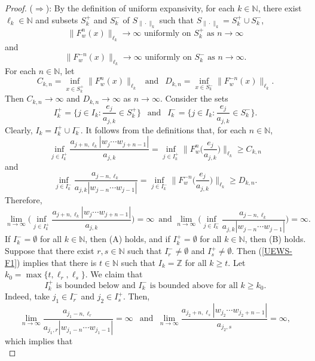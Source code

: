 \documentclass[10pt,a4paper]{amsart}
\newcommand{\N}{\mathbb{N}}   %
\newcommand{\Z}{\mathbb{Z}}   %
\begin{document}
\begin{proof}
($\Rightarrow$): By the definition of uniform expansivity, for each $k \in \N$, there exist $\ell_k \in \N$ 
and subsets $S_k^+$ and $S_k^-$ of $S_{\|\cdot\|_k}$ such that $S_{\|\cdot\|_k} = S_k^+ \cup S_k^-$,
\[
\|F_w^n(x)\|_{\ell_k} \to \infty \text{ uniformly on } S_k^+ \text{ as } n \to \infty
\]
and
\[
\|F_w^{-n}(x)\|_{\ell_k} \to \infty \text{ uniformly on } S_k^- \text{ as } n \to \infty.
\]
For each $n \in \N$, let
\[
C_{k,n} = \inf_{x \in S_k^+} \|F_w^n(x)\|_{\ell_k} \ \ \text{ and } \ \ D_{k,n} = \inf_{x \in S_k^-} \|F_w^{-n}(x)\|_{\ell_k}.
\]
Then $C_{k,n} \to \infty$ and $D_{k,n} \to \infty$ as $n \to \infty$. Consider the sets
\[
I_k^+ = \Big\{j \in I_k : \frac{e_j}{a_{j,k}} \in S_k^+\Big\} \ \ \text{ and } \ \ I_k^- = \Big\{j \in I_k : \frac{e_j}{a_{j,k}} \in S_k^-\Big\}.
\]
Clearly, $I_k = I_k^+ \cup I_k^-$. It follows from the definitions that, for each $n \in \N$,
\[
\inf_{j \in I_k^+} \frac{a_{j+n,\ell_k} |w_j \cdots w_{j+n-1}|}{a_{j,k}} 
  = \inf_{j \in I_k^+} \Big\|F_w^n\Big(\frac{e_j}{a_{j,k}}\Big)\Big\|_{\ell_k} \geq C_{k,n}
\]
and
\[
\inf_{j \in I_k^-} \frac{a_{j-n,\ell_k}}{a_{j,k} |w_{j-n} \cdots w_{j-1}|} 
  = \inf_{j \in I_k^-} \Big\|F_w^{-n}\Big(\frac{e_j}{a_{j,k}}\Big)\Big\|_{\ell_k} \geq D_{k,n}.
\]
Therefore, 
\begin{equation}\label{UEWS-F1}
\lim_{n \to \infty} \Big(\inf_{j \in I_k^+} \frac{a_{j+n,\ell_k} |w_j \cdots w_{j+n-1}|}{a_{j,k}}\Big) = \infty\, \text{ and }
\lim_{n \to \infty} \Big(\inf_{j \in I_k^-} \frac{a_{j-n,\ell_k}}{a_{j,k} |w_{j-n} \cdots w_{j-1}|}\Big) = \infty.
\end{equation}
If $I_k^- = \emptyset$ for all $k \in \N$, then (A) holds, and if $I_k^+ = \emptyset$ for all $k \in \N$, then (B) holds.
Suppose that there exist $r,s \in \N$ such that $I_r^- \neq \emptyset$ and $I_s^+ \neq \emptyset$.
Then (\ref{UEWS-F1}) implies that there is $t \in \N$ such that $I_k = \Z$ for all $k \geq t$.
Let $k_0 = \max\{t,\ell_r,\ell_s\}$. We claim that
\begin{equation}\label{UEWS-F2}
I_k^+ \text{ is bounded below and } I_k^- \text{ is bounded above for all } k \geq k_0.
\end{equation}
Indeed, take $j_1 \in I_r^-$ and $j_2 \in I_s^+$. Then,
\[
\lim_{n \to \infty} \frac{a_{j_1-n,\ell_r}}{a_{j_1,r} |w_{j_1-n} \cdots w_{j_1-1}|} = \infty \ \ \text{ and } \
\lim_{n \to \infty} \frac{a_{j_2+n,\ell_s} |w_{j_2} \cdots w_{j_2+n-1}|}{a_{j_2,s}} = \infty,
\]
which implies that
\begin{equation}\label{UEWS-F3}

\end{equation}
\end{proof}
\end{document}
